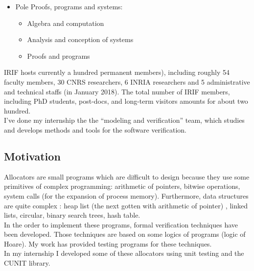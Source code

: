 \begin{itemize}
\item Pole Proofs, programs and systems:
\begin{itemize}
\item Algebra and computation
\end{itemize}
\begin{itemize}
\item Analysis and conception of systems 
\end{itemize}
\begin{itemize}
\item Proofs and programs
\end{itemize}

\end{itemize}
IRIF hosts currently a hundred permanent members), including roughly 54 faculty members, 30 CNRS researchers, 6 INRIA researchers and 5 administrative and technical staffs (in January 2018). The total number of IRIF members, including PhD students, post-docs, and long-term visitors amounts for about two hundred. \\

I've done my internship the the ``modeling and verification'' team, which studies and develops methods and tools for the software verification.


\subsection{Motivation}
Allocators are small programs which are difficult to design because they use some primitives of complex programming: arithmetic of pointers, bitwise operations, system calls (for the expansion of process memory).   
Furthermore, data structures are quite complex : heap list (the next gotten with arithmetic of pointer) , linked lists, circular, binary search trees, hash table.\\

In the order to implement these programs, formal verification techniques have been developed. Those techniques are based on some logics of programs (logic of Hoare). My work has provided testing programs for these techniques.\\

In my internship I developed some of these allocators using unit testing and the CUNIT library.\\

